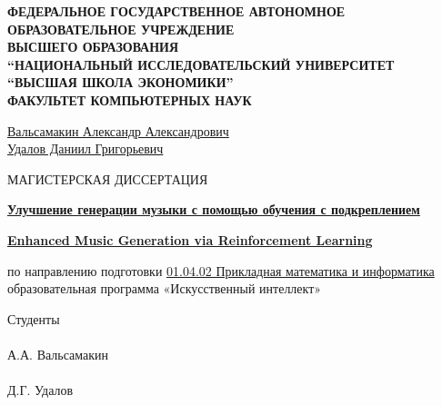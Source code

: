 \begin{titlepage}
\newpage
\thispagestyle{empty}
\small

\begin{center}
\textbf{ФЕДЕРАЛЬНОЕ ГОСУДАРСТВЕННОЕ АВТОНОМНОЕ ОБРАЗОВАТЕЛЬНОЕ УЧРЕЖДЕНИЕ}\\
\textbf{ВЫСШЕГО ОБРАЗОВАНИЯ}\\
\textbf{``НАЦИОНАЛЬНЫЙ ИССЛЕДОВАТЕЛЬСКИЙ УНИВЕРСИТЕТ}\\
\textbf{``ВЫСШАЯ ШКОЛА ЭКОНОМИКИ''}\\
\textbf{ФАКУЛЬТЕТ КОМПЬЮТЕРНЫХ НАУК}
\end{center}

\vspace{2.4cm}

\begin{center}
\uline{Вальсамакин Александр Александрович}\\
\uline{Удалов Даниил Григорьевич}
\end{center}

\vspace{1.4cm}

\begin{center}
МАГИСТЕРСКАЯ ДИССЕРТАЦИЯ
\end{center}

\vspace{0.6cm}

\begin{center}
\textbf{\uline{Улучшение генерации музыки с помощью обучения с подкреплением}}
\end{center}

\vspace{0.3cm}

\begin{center}
\textbf{\uline{Enhanced Music Generation via Reinforcement Learning}}
\end{center}

\vspace{0.6cm}

\begin{center}
по направлению подготовки \uline{01.04.02 Прикладная математика и информатика}\\
образовательная программа «Искусственный интеллект»
\end{center}

\vspace{1.8cm}

\noindent Студенты\\
\makebox[6cm]{\hrulefill}\\
А.А. Вальсамакин\\[0.35cm]
\makebox[6cm]{\hrulefill}\\
Д.Г. Удалов


\end{titlepage}
